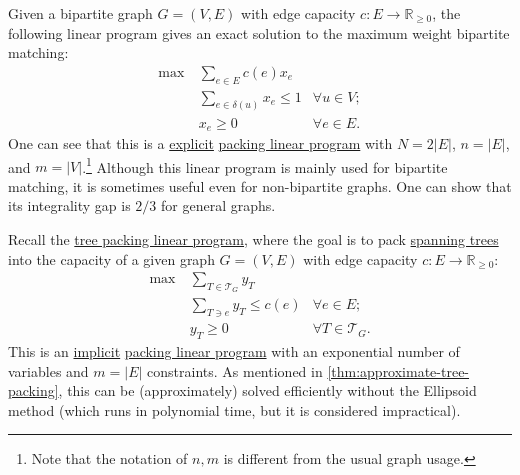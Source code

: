 \begin{eg}\label{eg:max-weight-bipartite-matching-MWU}
	Given a bipartite graph \(G = (V, E)\) with edge capacity \(c \colon E \to \mathbb{R} _{\geq 0}\), the following linear program gives an exact solution to the maximum weight bipartite matching:
	\[
		\begin{aligned}
			\max~ & \sum_{e \in E} c(e) x_e                                \\
			      & \sum_{e \in \delta (u)} x_e \leq 1 & \forall u \in V ; \\
			      & x_e \geq 0                         & \forall e \in E.
		\end{aligned}
	\]
	One can see that this is a \hyperref[def:explicit-LP]{explicit} \hyperref[def:packing-LP]{packing linear program} with \(N = 2 \lvert E \rvert \), \(n = \lvert E \rvert \), and \(m = \lvert V \rvert \).\footnote{Note that the notation of \(n, m\) is different from the usual graph usage.} Although this linear program is mainly used for bipartite matching, it is sometimes useful even for non-bipartite graphs. One can show that its integrality gap is \(2 / 3\) for general graphs.
\end{eg}

\begin{eg}\label{eg:tree-packing-MWU}
	Recall the \hyperref[eq:tree-packing-LP]{tree packing linear program}, where the goal is to pack \hyperref[def:spanning-tree]{spanning trees} into the capacity of a given graph \(G = (V, E)\) with edge capacity \(c \colon E \to \mathbb{R} _{\geq 0}\):
	\[
		\begin{aligned}
			\max~ & \sum_{T \in \mathcal{T} _G} y_T                                 \\
			      & \sum_{T \ni e} y_T \leq c(e)    & \forall e \in E;              \\
			      & y_T \geq 0                      & \forall T \in \mathcal{T} _G.
		\end{aligned}
	\]
	This is an \hyperref[def:implicit-LP]{implicit} \hyperref[def:packing-LP]{packing linear program} with an exponential number of variables and \(m = \lvert E \rvert \) constraints. As mentioned in \autoref{thm:approximate-tree-packing}, this can be (approximately) solved efficiently without the Ellipsoid method (which runs in polynomial time, but it is considered impractical).
\end{eg}

